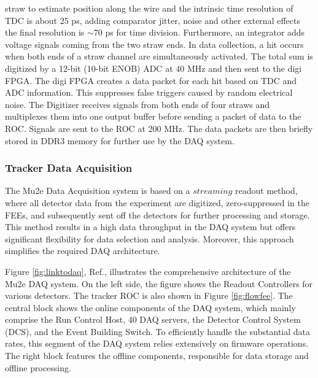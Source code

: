 straw to estimate position along the wire and the intrinsic time resolution of TDC is about 
25 ps, adding comparator jitter, noise and other external effects the final resolution is 
$\sim$70 ps for time division. Furthermore, an integrator adds voltage signals coming 
from the two straw ends. In data collection, a hit occurs when both ends of a straw channel 
are simultaneously activated. The total sum is digitized by a 12-bit (10-bit ENOB) ADC at 40 MHz
and then sent to the digi FPGA. The digi FPGA creates a data packet for each hit based on 
TDC and ADC information. This suppresses false triggers caused by random electrical noise. 
The Digitizer receives signals from both ends of four straws and multiplexes them into one 
output buffer before sending a packet of data to the ROC. Signals are sent to the ROC at 
200 MHz. The data packets are then briefly stored in DDR3 memory for further use by the 
DAQ system. 

\subsubsection{Tracker Data Acquisition}\label{tdaqtra}
The Mu2e Data Acquisition system is based on a $streaming$ readout method, 
where all detector data from the experiment are digitized, 
zero-suppressed in the FEEs, and subsequently sent off the detectors for further processing and storage. 
This method results in a high data throughput in the DAQ system but offers significant 
flexibility for data selection and analysis. Moreover, this approach simplifies the required DAQ architecture. 

Figure \ref{fig:linktodaq}, Ref.\cite{GIOIOSA2023167732}, illustrates the comprehensive 
architecture of the Mu2e DAQ system. On the left side, the figure shows the Readout Controllers 
for various detectors. The tracker ROC is also shown in Figure \ref{fig:flowfee}. 
The central block shows the online components of the DAQ system, which mainly comprise the Run Control Host, 
40 DAQ servers, the Detector Control System (DCS), and the Event Building Switch. 
To efficiently handle the substantial data rates, this segment of the DAQ system relies 
extensively on firmware operations. The right block features the offline components, responsible for data storage and offline processing.

